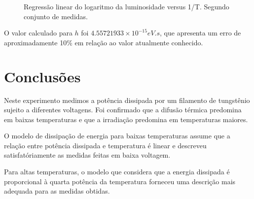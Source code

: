 \documentclass[brazilian,12pt,a4paper,final]{article}
\begin{document}
\begin{figure}[htbp!]
  \caption{Regressão linear do logaritmo da luminosidade versus 1/T. Segundo conjunto de medidas.}
  \label{fighhh}
  \centering
\end{figure}

O valor calculado para $h$ foi $4.55721933 \times 10^{-15} eV.s$, que apresenta
um erro de aproximadamente 10\% em relação ao valor atualmente conhecido.

\section{Conclusões}
Neste experimento medimos a potência dissipada por um filamento de tungstênio
sujeito a diferentes voltagens. Foi confirmado que a difusão térmica predomina
em baixas temperaturas e que a irradiação predomina em temperaturas maiores.

O modelo de dissipação de energia para baixas temperaturas
assume que a relação entre potência dissipada e temperatura é linear
e descreveu satisfatóriamente as medidas feitas em baixa voltagem.

Para altas temperaturas, 
o modelo que considera que 
a energia dissipada é proporcional à quarta potência da temperatura 
forneceu uma descrição mais adequada para as medidas obtidas.
\end{document}
